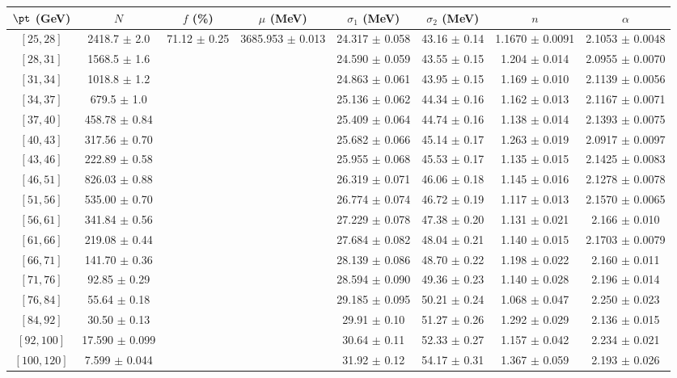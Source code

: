 \begin{tabular}{c||c|c|c|c|c|c|c}
$\pt$ (GeV) & $N$ & $f$ (\%) & $\mu$ (MeV) & $\sigma_1$ (MeV) & $\sigma_2$ (MeV) & $n$ & $\alpha$ \\
\hline
$[25, 28]$ & 2418.7 $\pm$ 2.0 & \multirow{17}{*}{71.12 $\pm$ 0.25} & \multirow{17}{*}{3685.953 $\pm$ 0.013} & 24.317 $\pm$ 0.058 & 43.16 $\pm$ 0.14 & 1.1670 $\pm$ 0.0091 & 2.1053 $\pm$ 0.0048\\
$[28, 31]$ & 1568.5 $\pm$ 1.6 &  &  & 24.590 $\pm$ 0.059 & 43.55 $\pm$ 0.15 & 1.204 $\pm$ 0.014 & 2.0955 $\pm$ 0.0070\\
$[31, 34]$ & 1018.8 $\pm$ 1.2 &  &  & 24.863 $\pm$ 0.061 & 43.95 $\pm$ 0.15 & 1.169 $\pm$ 0.010 & 2.1139 $\pm$ 0.0056\\
$[34, 37]$ & 679.5 $\pm$ 1.0 &  &  & 25.136 $\pm$ 0.062 & 44.34 $\pm$ 0.16 & 1.162 $\pm$ 0.013 & 2.1167 $\pm$ 0.0071\\
$[37, 40]$ & 458.78 $\pm$ 0.84 &  &  & 25.409 $\pm$ 0.064 & 44.74 $\pm$ 0.16 & 1.138 $\pm$ 0.014 & 2.1393 $\pm$ 0.0075\\
$[40, 43]$ & 317.56 $\pm$ 0.70 &  &  & 25.682 $\pm$ 0.066 & 45.14 $\pm$ 0.17 & 1.263 $\pm$ 0.019 & 2.0917 $\pm$ 0.0097\\
$[43, 46]$ & 222.89 $\pm$ 0.58 &  &  & 25.955 $\pm$ 0.068 & 45.53 $\pm$ 0.17 & 1.135 $\pm$ 0.015 & 2.1425 $\pm$ 0.0083\\
$[46, 51]$ & 826.03 $\pm$ 0.88 &  &  & 26.319 $\pm$ 0.071 & 46.06 $\pm$ 0.18 & 1.145 $\pm$ 0.016 & 2.1278 $\pm$ 0.0078\\
$[51, 56]$ & 535.00 $\pm$ 0.70 &  &  & 26.774 $\pm$ 0.074 & 46.72 $\pm$ 0.19 & 1.117 $\pm$ 0.013 & 2.1570 $\pm$ 0.0065\\
$[56, 61]$ & 341.84 $\pm$ 0.56 &  &  & 27.229 $\pm$ 0.078 & 47.38 $\pm$ 0.20 & 1.131 $\pm$ 0.021 & 2.166 $\pm$ 0.010\\
$[61, 66]$ & 219.08 $\pm$ 0.44 &  &  & 27.684 $\pm$ 0.082 & 48.04 $\pm$ 0.21 & 1.140 $\pm$ 0.015 & 2.1703 $\pm$ 0.0079\\
$[66, 71]$ & 141.70 $\pm$ 0.36 &  &  & 28.139 $\pm$ 0.086 & 48.70 $\pm$ 0.22 & 1.198 $\pm$ 0.022 & 2.160 $\pm$ 0.011\\
$[71, 76]$ & 92.85 $\pm$ 0.29 &  &  & 28.594 $\pm$ 0.090 & 49.36 $\pm$ 0.23 & 1.140 $\pm$ 0.028 & 2.196 $\pm$ 0.014\\
$[76, 84]$ & 55.64 $\pm$ 0.18 &  &  & 29.185 $\pm$ 0.095 & 50.21 $\pm$ 0.24 & 1.068 $\pm$ 0.047 & 2.250 $\pm$ 0.023\\
$[84, 92]$ & 30.50 $\pm$ 0.13 &  &  & 29.91 $\pm$ 0.10 & 51.27 $\pm$ 0.26 & 1.292 $\pm$ 0.029 & 2.136 $\pm$ 0.015\\
$[92, 100]$ & 17.590 $\pm$ 0.099 &  &  & 30.64 $\pm$ 0.11 & 52.33 $\pm$ 0.27 & 1.157 $\pm$ 0.042 & 2.234 $\pm$ 0.021\\
$[100, 120]$ & 7.599 $\pm$ 0.044 &  &  & 31.92 $\pm$ 0.12 & 54.17 $\pm$ 0.31 & 1.367 $\pm$ 0.059 & 2.193 $\pm$ 0.026\\
\end{tabular}
